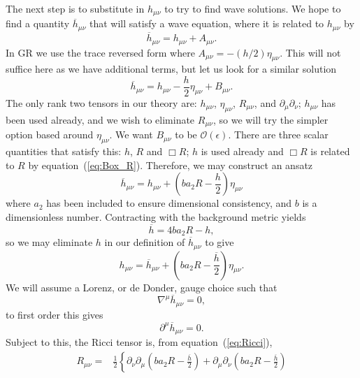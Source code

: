 \documentclass[a4paper, 11pt, titlepage, twoside]{report}
\newcommand{\eqnref}[1]{equation~(\ref{eq:#1})}
\newcommand{\order}[1]{\ensuremath{\mathcal{O}({#1})}}
\begin{document}
{The next step is to substitute in $h_{\mu\nu}$ to try to find wave solutions. We hope to find a quantity $\overline{h}_{\mu\nu}$ that will satisfy a wave equation, where it is related to $h_{\mu\nu}$ by
\begin{equation}
\overline{h}_{\mu\nu} = h_{\mu\nu} + A_{\mu\nu}.
\end{equation}
In GR we use the trace reversed form where $A_{\mu\nu} = -(h/2)\eta_{\mu\nu}$. This will not suffice here as we have additional terms, but let us look for a similar solution
\begin{equation}
\overline{h}_{\mu\nu} = h_{\mu\nu} - \frac{h}{2}\eta_{\mu\nu} + B_{\mu\nu}.
\end{equation}
The only rank two tensors in our theory are: $h_{\mu\nu}$, $\eta_{\mu\nu}$, $R_{\mu\nu}$, and $\partial_\mu\partial_\nu$; $h_{\mu\nu}$ has been used already, and we wish to eliminate $R_{\mu\nu}$, so we will try the simpler option based around $\eta_{\mu\nu}$. We want $B_{\mu\nu}$ to be $\order{\epsilon}$. There are three scalar quantities that satisfy this: $h$, $R$ and $\Box R$; $h$ is used already and $\Box R$ is related to $R$ by \eqnref{Box_R}. Therefore, we may construct an ansatz
\begin{equation}
\overline{h}_{\mu\nu} = h_{\mu\nu} + \left(b a_2 R - \frac{h}{2}\right)\eta_{\mu\nu}
\label{eq:Ansatz}
\end{equation}
where $a_2$ has been included to ensure dimensional consistency, and $b$ is a dimensionless number. Contracting with the background metric yields
\begin{equation}
\overline{h} = 4b a_2 R - h,
\label{eq:h_trace}
\end{equation}
so we may eliminate $h$ in our definition of $\overline{h}_{\mu\nu}$ to give
\begin{equation}
h_{\mu\nu} = \overline{h}_{\mu\nu} + \left(b a_2 R -\frac{\overline{h}}{2}\right)\eta_{\mu\nu}.
\end{equation}
We will assume a Lorenz, or de Donder, gauge choice such that
\begin{equation}
\nabla^\mu \overline{h}_{\mu\nu} = 0,
\label{eq:Lorenz}
\end{equation}
to first order this gives
\begin{equation}
\partial^\mu \overline{h}_{\mu\nu} = 0.
\end{equation}
Subject to this, the Ricci tensor is, from \eqnref{Ricci},
\begin{align}
R_{\mu\nu} = {} & \frac{1}{2}\left\{\partial_\nu\partial_\mu \left(b a_2 R -\frac{\overline{h}}{2}\right) + \partial_\mu\partial_\nu \left(b a_2 R -\frac{\overline{h}}{2}\right) \right. \nonumber \\

\end{align}}
\end{document}
